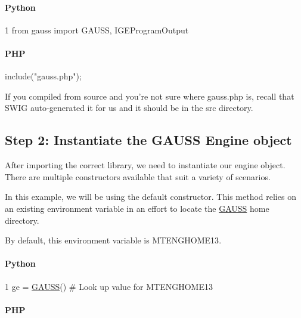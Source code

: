 \paragraph*{Python}


\begin{DoxyCode}
1 \textcolor{keyword}{from} gauss \textcolor{keyword}{import} GAUSS, IGEProgramOutput
\end{DoxyCode}


\paragraph*{P\-H\-P}


\begin{DoxyCode}
include(\textcolor{stringliteral}{"gauss.php"});
\end{DoxyCode}


If you compiled from source and you're not sure where {\ttfamily gauss.\-php} is, recall that S\-W\-I\-G auto-\/generated it for us and it should be in the {\ttfamily src} directory.\hypertarget{index_hw_step2}{}\subsection{Step 2\-: Instantiate the G\-A\-U\-S\-S Engine object}\label{index_hw_step2}
After importing the correct library, we need to instantiate our engine object. There are multiple constructors available that suit a variety of scenarios.

In this example, we will be using the default constructor. This method relies on an existing environment variable in an effort to locate the \hyperlink{class_g_a_u_s_s}{G\-A\-U\-S\-S} home directory.

By default, this environment variable is {\ttfamily M\-T\-E\-N\-G\-H\-O\-M\-E13}.

\paragraph*{Python}


\begin{DoxyCode}
1 ge = \hyperlink{class_g_a_u_s_s}{GAUSS}()  \textcolor{comment}{# Look up value for MTENGHOME13}
\end{DoxyCode}
 \paragraph*{P\-H\-P}




